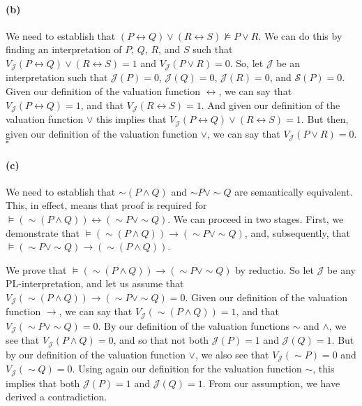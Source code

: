 \documentclass[sloppy, journal, git, bytitle]{humapap}
\begin{document}
\paragraph{(b)} We need to establish that $(P\leftrightarrow Q)\vee(R\leftrightarrow S)\nvDash P\vee R$.
We can do this by finding an interpretation of $P$, $Q$, $R$, and $S$ such that 
$V\mathcal{_J}(P\leftrightarrow Q)\vee(R\leftrightarrow S)=1$ and 
$V\mathcal{_J}(P\vee R)=0$. 
So, let $\mathcal{J}$ be an interpretation such that 
$\mathcal{J}(P)=0$, 
$\mathcal{J}(Q)=0$, 
$\mathcal{J}(R)=0$, and 
$\mathcal{S}(P)=0$. 
Given our definition of the valuation function $\leftrightarrow$, we can say that 
$V\mathcal{_J}(P\leftrightarrow Q)=1$, and that 
$V\mathcal{_J}(R\leftrightarrow S)=1$.
And given our definition of the valuation function $\vee$ this implies that 
$V\mathcal{_J}(P\leftrightarrow Q)\vee(R\leftrightarrow S)=1$. 
But then, given our definition of the valuation function $\vee$, we can say that 
$V\mathcal{_J}(P\vee R)=0$. $\square$ 

\paragraph{(c)} We need to establish that $\sim(P\wedge Q)$ and $\sim P\vee\sim Q$ are semantically equivalent. 
This, in effect, means that proof is required for $\vDash (\sim(P\wedge Q))\leftrightarrow(\sim P\vee\sim Q)$. 
We can proceed in two stages. 
First, we demonstrate that $\vDash (\sim(P\wedge Q))\rightarrow(\sim P\vee\sim Q)$, 
and, subsequently, that $\vDash (\sim P\vee\sim Q)\rightarrow(\sim(P\wedge Q))$. 

We prove that $\vDash (\sim(P\wedge Q))\rightarrow(\sim P\vee\sim Q)$ by reductio. 
So let $\mathcal{J}$ be any PL-interpretation, and let us assume that 
$V\mathcal{_J}(\sim(P\wedge Q))\rightarrow(\sim P\vee\sim Q)=0$. 
Given our definition of the valuation function $\rightarrow$, we can say that 
$V\mathcal{_J}(\sim(P\wedge Q))=1$, and that 
$V\mathcal{_J}(\sim P\vee\sim Q)=0$. 
By our definition of the valuation functions $\sim$ and $\wedge$, we see that 
$V\mathcal{_J}(P\wedge Q)=0$, and so that not both $\mathcal{J}(P)=1$ and $\mathcal{J}(Q)=1$.
But by our definition of the valuation function $\vee$, we also see that 
$V\mathcal{_J}(\sim P)=0$ and 
$V\mathcal{_J}(\sim Q)=0$. 
Using again our definition for the valuation function $\sim$, this implies that both 
$\mathcal{J}(P)=1$ and 
$\mathcal{J}(Q)=1$.
From our assumption, we have derived a contradiction. 
\end{document}
